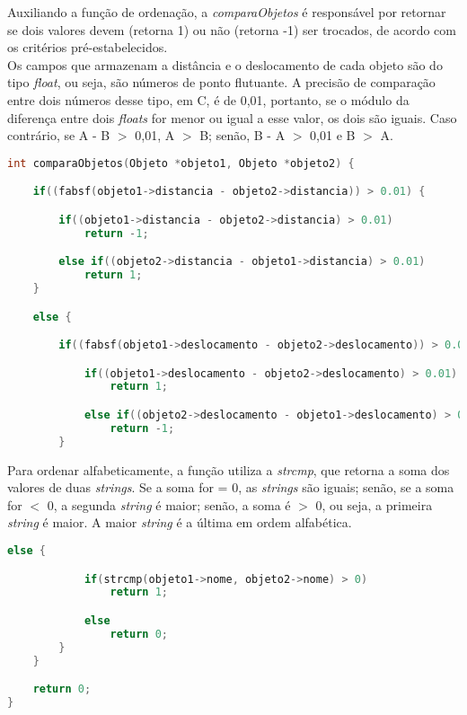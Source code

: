 \documentclass{article}
\begin{document}
\hspace*{\parindent}Auxiliando a função de ordenação, a \textit{comparaObjetos} é responsável por retornar se dois valores devem (retorna 1) ou não (retorna -1) ser trocados, de acordo com os critérios pré-estabelecidos.\\
\hspace*{\parindent}Os campos que armazenam a distância e o deslocamento de cada objeto são do tipo \textit{float}, ou seja, são números de ponto flutuante. A precisão de comparação entre dois números desse tipo, em C, é de 0,01, portanto, se o módulo da diferença entre dois \textit{floats} for menor ou igual a esse valor, os dois são iguais. Caso contrário, se A - B $>$ 0,01, A $>$ B; senão, B - A $>$ 0,01 e B $>$ A.

\clearpage

\begin{lstlisting}[label={lst:cod1},language=C]
int comparaObjetos(Objeto *objeto1, Objeto *objeto2) {

    if((fabsf(objeto1->distancia - objeto2->distancia)) > 0.01) {

        if((objeto1->distancia - objeto2->distancia) > 0.01)
            return -1;

        else if((objeto2->distancia - objeto1->distancia) > 0.01)
            return 1;
    }

    else {

        if((fabsf(objeto1->deslocamento - objeto2->deslocamento)) > 0.01) {

            if((objeto1->deslocamento - objeto2->deslocamento) > 0.01)
                return 1;

            else if((objeto2->deslocamento - objeto1->deslocamento) > 0.01)
                return -1;
        }    
\end{lstlisting}

\hspace*{\parindent}Para ordenar alfabeticamente, a função utiliza a \textit{strcmp}, que retorna a soma dos valores de duas \textit{strings}. Se a soma for = 0, as \textit{strings} são iguais; senão, se a soma for $<$ 0, a segunda \textit{string} é maior; senão, a soma é $>$ 0, ou seja, a primeira \textit{string} é maior. A maior \textit{string} é a última em ordem alfabética.

\begin{lstlisting}[label={lst:cod1},language=C]
        else {

            if(strcmp(objeto1->nome, objeto2->nome) > 0)
                return 1;

            else
                return 0;
        }
    }

    return 0;
}
\end{lstlisting}
\end{document}
